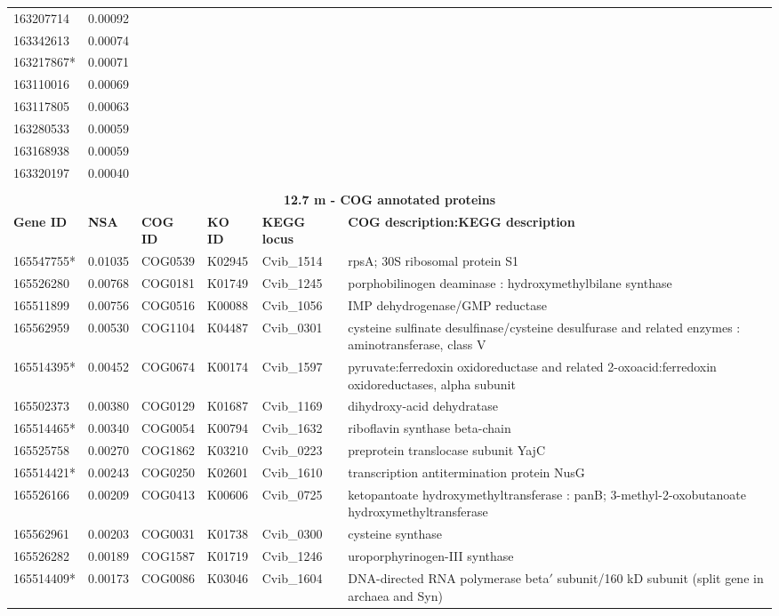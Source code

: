 \begin{landscape}
\begin{longtable}{p{1.6cm}p{1.2cm}p{1.5cm}p{1.5cm}p{2.8cm}p{13.5cm}}
163207714&0.00092&&&& \\
163342613&0.00074&&&& \\
163217867*&0.00071&&&& \\
163110016&0.00069&&&& \\
163117805&0.00063&&&& \\
163280533&0.00059&&&& \\
163168938&0.00059&&&& \\
163320197&0.00040&&&& \\
&&&&& \\
\multicolumn{6}{c}{\textbf{12.7 m - COG annotated proteins}} \\
\textbf{Gene ID} & \textbf{NSA} & \textbf{COG ID} & \textbf{KO ID} & \textbf{KEGG locus} & \textbf{COG description:KEGG description} \\
165547755*&0.01035&COG0539&K02945&Cvib\_1514&rpsA; 30S ribosomal protein S1 \\
165526280&0.00768&COG0181&K01749&Cvib\_1245&porphobilinogen deaminase : hydroxymethylbilane synthase \\
165511899&0.00756&COG0516&K00088&Cvib\_1056&IMP dehydrogenase/GMP reductase \\
165562959&0.00530&COG1104&K04487&Cvib\_0301&cysteine sulfinate desulfinase/cysteine desulfurase and related enzymes : aminotransferase, class V \\
165514395*&0.00452&COG0674&K00174&Cvib\_1597&pyruvate:ferredoxin oxidoreductase and related 2-oxoacid:ferredoxin oxidoreductases, alpha subunit \\
165502373&0.00380&COG0129&K01687&Cvib\_1169&dihydroxy-acid dehydratase \\
165514465*&0.00340&COG0054&K00794&Cvib\_1632&riboflavin synthase beta-chain \\
165525758&0.00270&COG1862&K03210&Cvib\_0223&preprotein translocase subunit YajC \\
165514421*&0.00243&COG0250&K02601&Cvib\_1610&transcription antitermination protein NusG \\
165526166&0.00209&COG0413&K00606&Cvib\_0725&ketopantoate hydroxymethyltransferase : panB; 3-methyl-2-oxobutanoate hydroxymethyltransferase \\
165562961&0.00203&COG0031&K01738&Cvib\_0300&cysteine synthase \\
165526282&0.00189&COG1587&K01719&Cvib\_1246&uroporphyrinogen-III synthase \\
165514409*&0.00173&COG0086&K03046&Cvib\_1604&DNA-directed RNA polymerase beta$'$ subunit/160 kD subunit (split gene in archaea and Syn) \\

\end{longtable}
\end{landscape}
